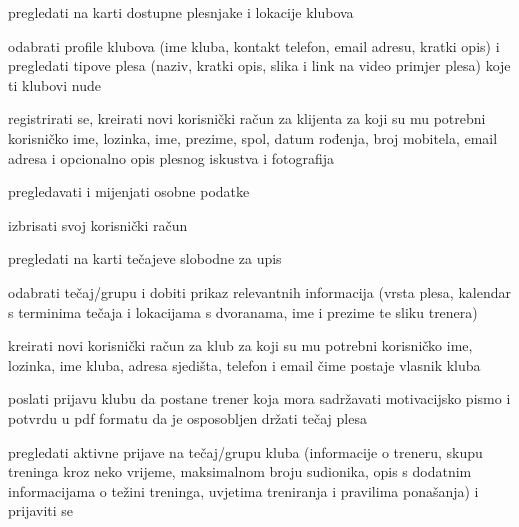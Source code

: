 			
			\begin{packed_enum}
				\item  {}
				
				\begin{packed_enum}
					\item pregledati na karti dostupne plesnjake i lokacije klubova
					\item odabrati profile klubova (ime kluba, kontakt telefon, email adresu, kratki opis)  i pregledati tipove plesa (naziv, kratki opis, slika i link na video primjer plesa) koje ti klubovi nude
					\item registrirati se, kreirati novi korisnički račun za klijenta za koji su mu potrebni korisničko ime, lozinka, ime, prezime, spol, datum rođenja, broj mobitela, email adresa i opcionalno opis plesnog iskustva i fotografija
					

					
				\end{packed_enum}
			
				\item  {}
				
				\begin{packed_enum}
					
					\item pregledavati i mijenjati osobne podatke
					\item izbrisati svoj korisnički račun
					\item  pregledati na karti tečajeve slobodne za upis 
					\item odabrati tečaj/grupu i dobiti prikaz relevantnih informacija (vrsta plesa, kalendar s terminima tečaja i lokacijama s dvoranama, ime i prezime te sliku trenera)
					\item kreirati novi korisnički račun za klub za koji su mu potrebni korisničko ime, lozinka, ime kluba, adresa sjedišta, telefon i email čime postaje vlasnik kluba
					\item poslati prijavu klubu da postane trener koja mora sadržavati motivacijsko pismo i potvrdu u pdf formatu da je osposobljen držati tečaj plesa
					\item pregledati aktivne prijave na tečaj/grupu kluba (informacije o treneru, skupu treninga kroz neko vrijeme, maksimalnom broju sudionika, opis s dodatnim informacijama o težini treninga, uvjetima treniranja i pravilima ponašanja) i prijaviti se

					
				\end{packed_enum}
			

\end{packed_enum}
